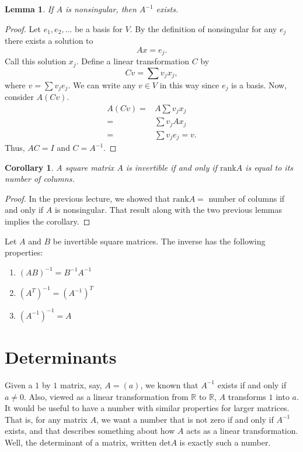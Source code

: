 \documentclass[12pt,reqno]{amsart}
\def\R{\mathbb{R}}
\renewcommand{\det}{\mathrm{det}}
\newcommand{\rank}{\mathrm{rank}}
\newtheorem{corollary}{Corollary}[section]
\newtheorem{lemma}{Lemma}[section]
\theoremstyle{definition}
\begin{document}
\begin{lemma}
  If $A$ is nonsingular, then $A^{-1}$ exists.
\end{lemma}
\begin{proof}
  Let $e_1, e_2, ... $ be a basis for $V$.  By the definition of
  nonsingular for any $e_j$ there exists a solution to 
  \[ A x = e_j. \]
  Call this solution $x_j$.  Define a linear transformation $C$ by 
  \[ C v = \sum v_j x_j, \]
  where $v = \sum v_j e_j $. We can write any $v \in V$ in this way
  since $e_j$ is a basis. Now, consider $A(Cv)$.
  \begin{align*}
    A (C v) = & A \sum v_j x_j \\
    = & \sum v_j A x_j \\
    = & \sum v_j e_j = v.
  \end{align*}
  Thus, $AC = I$ and $C = A^{-1}$.
\end{proof}
\begin{corollary}
  A square matrix $A$ is invertible if and only if $\rank A$ is equal
  to its number of columns.
\end{corollary}
\begin{proof}
  In the previous lecture, we showed that $\rank A = $ number of
  columns if and only if $A$ is nonsingular. That result along with
  the two previous lemmas implies the corollary.
\end{proof}

Let $A$ and $B$ be invertible square matrices. The inverse has the
following properties:
\begin{enumerate}
\item $(AB)^{-1} = B^{-1} A^{-1}$
\item $(A^T)^{-1} = (A^{-1})^T$
\item $(A^{-1})^{-1} = A$
\end{enumerate}

\section{Determinants}

Given a $1$ by $1$ matrix, say, $A = (a)$, we known that $A^{-1}$
exists if and only if $a \neq 0$. Also, viewed as a linear
transformation from $\R$ to $\R$, $A$ transforms $1$ into $a$. It
would be useful to have a number with similar properties for larger
matrices. That is, for any matrix $A$, we want a number that is not
zero if and only if $A^{-1}$ exists, and that describes something
about how $A$ acts as a linear transformation. Well, the determinant
of a matrix, written $\det A$ is exactly such a number. 
\end{document}
